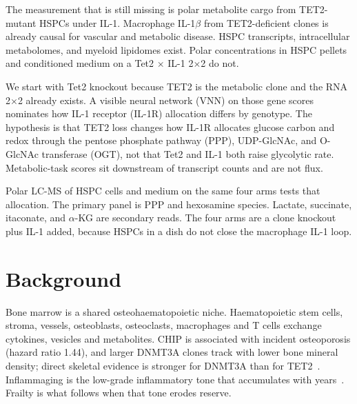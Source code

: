 \documentclass[11pt]{article}
\begin{document}
The measurement that is still missing is polar metabolite cargo from TET2-mutant HSPCs
under IL-1. Macrophage IL-1$\beta$ from TET2-deficient clones is already causal for
vascular and metabolic disease. HSPC transcripts, intracellular metabolomes, and myeloid
lipidomes exist. Polar concentrations in HSPC pellets and conditioned medium on a Tet2
$\times$ IL-1 2$\times$2 do not.

We start with Tet2 knockout because TET2 is the metabolic clone and the RNA 2$\times$2
already exists. A visible neural network (VNN) on those gene scores nominates how IL-1
receptor (IL-1R) allocation differs by genotype. The hypothesis is that TET2 loss
changes how IL-1R allocates glucose carbon and redox through the pentose phosphate
pathway (PPP), UDP-GlcNAc, and O-GlcNAc transferase (OGT), not that Tet2 and IL-1 both
raise glycolytic rate. Metabolic-task scores sit downstream of transcript counts and are
not flux.

Polar LC-MS of HSPC cells and medium on the same four arms tests that allocation. The
primary panel is PPP and hexosamine species. Lactate, succinate, itaconate, and
$\alpha$-KG are secondary reads. The four arms are a clone knockout plus IL-1 added,
because HSPCs in a dish do not close the macrophage IL-1 loop.

\section*{Background}

Bone marrow is a shared osteohaematopoietic niche. Haematopoietic stem cells, stroma,
vessels, osteoblasts, osteoclasts, macrophages and T cells exchange cytokines, vesicles
and metabolites. CHIP is associated with incident osteoporosis (hazard ratio 1.44), and
larger DNMT3A clones track with lower bone mineral density; direct skeletal evidence is
stronger for DNMT3A than for
TET2~\cite{He2026ImmuneAgeingSkeletal,Winter2024CHOsteoNiche,Kim2021Dnmt3aOsteoporosis,Wang2024DNMT3Abone}.
Inflammaging is the low-grade inflammatory tone that accumulates with
years~\cite{Franceschi2014Inflammaging}. Frailty is what follows when that tone erodes
reserve.
\end{document}
